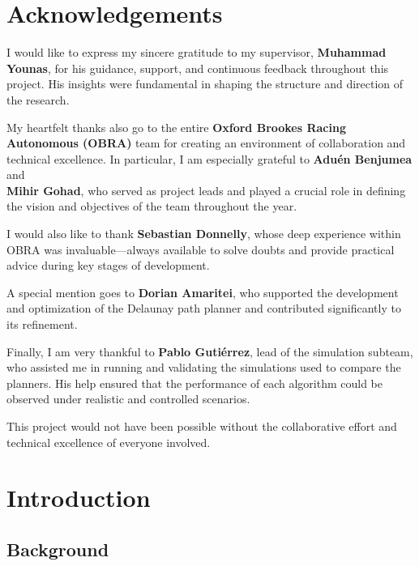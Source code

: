 \documentclass[a4paper,11pt]{report}
\begin{document}
\chapter*{Acknowledgements}

I would like to express my sincere gratitude to my supervisor, \textbf{Muhammad Younas}, for his guidance, support, and continuous feedback throughout this project. His insights were fundamental in shaping the structure and direction of the research.

My heartfelt thanks also go to the entire \textbf{Oxford Brookes Racing Autonomous (OBRA)} team for creating an environment of collaboration and technical excellence. In particular, I am especially grateful to \textbf{Aduén Benjumea} and\\ \textbf{Mihir Gohad}, who served as project leads and played a crucial role in defining the vision and objectives of the team throughout the year.

I would also like to thank \textbf{Sebastian Donnelly}, whose deep experience within OBRA was invaluable—always available to solve doubts and provide practical advice during key stages of development. 

A special mention goes to \textbf{Dorian Amaritei}, who supported the development and optimization of the Delaunay path planner and contributed significantly to its refinement.

Finally, I am very thankful to \textbf{Pablo Gutiérrez}, lead of the simulation subteam, who assisted me in running and validating the simulations used to compare the planners. His help ensured that the performance of each algorithm could be observed under realistic and controlled scenarios.

This project would not have been possible without the collaborative effort and technical excellence of everyone involved.

\newpage


\chapter{Introduction}
\section{Background}
\end{document}
